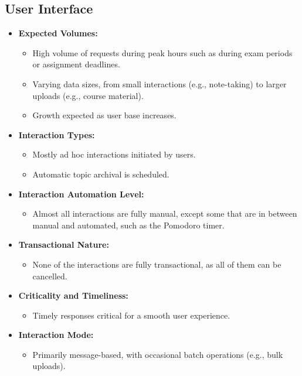 \subsection*{User Interface}
\begin{itemize}
    \item \textbf{Expected Volumes:}
          \begin{itemize}
              \item High volume of requests during peak hours such as during exam periods or assignment deadlines.
              \item Varying data sizes, from small interactions (e.g., note-taking) to larger uploads (e.g., course material).
              \item Growth expected as user base increases.
          \end{itemize}
    \item \textbf{Interaction Types:}
          \begin{itemize}
              \item Mostly ad hoc interactions initiated by users.
              \item Automatic topic archival is scheduled.
          \end{itemize}
    \item \textbf{Interaction Automation Level:}
          \begin{itemize}
              \item Almost all interactions are fully manual, except some that are in between manual and automated, such as the Pomodoro timer.
          \end{itemize}
    \item \textbf{Transactional Nature:}
          \begin{itemize}
              \item None of the interactions are fully transactional, as all of them can be cancelled.
          \end{itemize}
    \item \textbf{Criticality and Timeliness:}
          \begin{itemize}
              \item Timely responses critical for a smooth user experience.
          \end{itemize}
    \item \textbf{Interaction Mode:}
          \begin{itemize}
              \item Primarily message-based, with occasional batch operations (e.g., bulk uploads).

\end{itemize}
\end{itemize}
